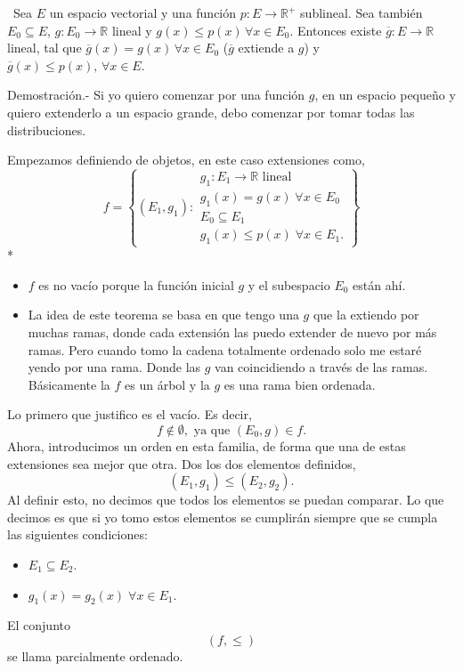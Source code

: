 \begin{paracol}{2}
\switchcolumn[0]\noindent
\begin{teo}\,
    Sea $E$ un espacio vectorial y una función $p:E\to \mathbb{R}^+$ sublineal. Sea también $E_0\subseteq E$, $g:E_0\to \mathbb{R}$ lineal y $g(x)\leq p(x)\,\forall x\in E_0$. Entonces existe $\overline{g}:E\to \mathbb{R}$ lineal, tal que $\overline{g}(x)=g(x)\,\forall x\in E_0$ ($\overline{g}$ extiende a $g$) y $\overline{g}(x)\leq p(x),\, \forall x\in E$.

	Demostración.-\; Si yo quiero comenzar por una función $g$, en un espacio pequeño y quiero extenderlo a un espacio grande, debo comenzar por tomar todas las distribuciones.

	Empezamos definiendo de objetos, en este caso extensiones como,
	$$f=\left\{(E_1,g_1):
	    \begin{array}{l}
		g_1:E_1\to \mathbb{R} \text{ lineal}\\
		g_1(x)=g(x)\; \forall x\in E_0\\
		E_0\subseteq E_1\\
		g_1(x)\leq p(x)\; \forall x\in E_1.
	    \end{array}
	\right\}$$
\switchcolumn[1]*{\noindent\scriptsize
    \begin{itemize}
	\item $f$ es no vacío porque la función inicial $g$ y el subespacio $E_0$ están ahí.
	\item La idea de este teorema se basa en que tengo una $g$ que la extiendo por muchas ramas, donde cada extensión las puedo extender de nuevo por más ramas. Pero cuando tomo la cadena totalmente ordenado solo me estaré yendo por una rama. Donde las $g$ van coincidiendo a través de las ramas. Básicamente la $f$ es un árbol y la $g$ es una rama bien ordenada.
    \end{itemize}
}
\switchcolumn[0]\noindent
	Lo primero que justifico es el vacío. Es decir, 
	$$f \notin \emptyset,\text{ ya que } (E_0,g)\in f.$$
	Ahora, introducimos un orden en esta familia, de forma que una de estas extensiones sea mejor que otra. Dos los dos elementos definidos, 
	$$(E_1,g_1)\leq (E_2,g_2).$$
	Al definir esto, no decimos que todos los elementos se puedan comparar. Lo que decimos es que si yo tomo estos elementos se cumplirán siempre que se cumpla las siguientes condiciones:
	\begin{itemize}
	    \item $E_1\subseteq E_2$.
	    \item $g_1(x)=g_2(x)\; \forall x\in E_1.$
	\end{itemize}
	El conjunto 
	$$\left(f,\leq\right)$$
	se llama parcialmente ordenado.


\end{teo}
\end{paracol}
